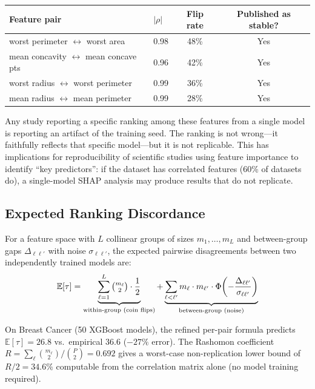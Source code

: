 \documentclass{jmlr}
\newcommand{\E}{\mathbb{E}}
\begin{document}
\begin{center}
\small
\begin{tabular}{@{}llcc@{}}
\toprule
Feature pair & $|\rho|$ & Flip rate & Published as stable? \\
\midrule
worst perimeter $\leftrightarrow$ worst area & 0.98 & 48\% & Yes \\
mean concavity $\leftrightarrow$ mean concave pts & 0.96 & 42\% & Yes \\
worst radius $\leftrightarrow$ worst perimeter & 0.99 & 36\% & Yes \\
mean radius $\leftrightarrow$ mean perimeter & 0.99 & 28\% & Yes \\
\bottomrule
\end{tabular}
\end{center}

Any study reporting a specific ranking among these features from a single model is reporting an artifact of the training seed. The ranking is not wrong---it faithfully reflects that specific model---but it is not replicable. This has implications for reproducibility of scientific studies using feature importance to identify ``key predictors'': if the dataset has correlated features (60\% of datasets do), a single-model SHAP analysis may produce results that do not replicate.

\subsection{Expected Ranking Discordance}

\begin{proposition}
\label{prop:kendall-tau}
For a feature space with $L$ collinear groups of sizes $m_1, \ldots, m_L$ and between-group gaps $\Delta_{\ell\ell'}$ with noise $\sigma_{\ell\ell'}$, the expected pairwise disagreements between two independently trained models are:
\[
    \E[\tau] = \underbrace{\sum_{\ell=1}^{L} \tbinom{m_\ell}{2} \cdot \frac{1}{2}}_{\text{within-group (coin flips)}} + \underbrace{\sum_{\ell < \ell'} m_\ell \cdot m_{\ell'} \cdot \Phi\!\left(-\frac{\Delta_{\ell\ell'}}{\sigma_{\ell\ell'}}\right)}_{\text{between-group (noise)}}
\]
\end{proposition}

On Breast Cancer (50 XGBoost models), the refined per-pair formula predicts $\E[\tau] = 26.8$ vs.\ empirical $36.6$ ($-27\%$ error). The Rashomon coefficient $R = \sum_\ell \binom{m_\ell}{2}/\binom{P}{2} = 0.692$ gives a worst-case non-replication lower bound of $R/2 = 34.6\%$ computable from the correlation matrix alone (no model training required).
\end{document}
